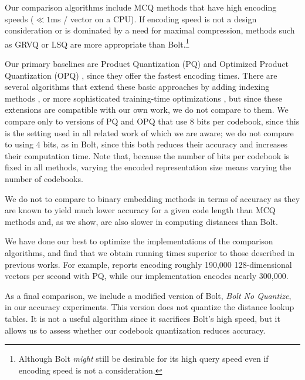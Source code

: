 Our comparison algorithms include MCQ methods that have high encoding speeds ($\ll 1$ms / vector on a CPU). If encoding speed is not a design consideration or is dominated by a need for maximal compression, methods such as GRVQ \cite{grvq} or LSQ \cite{lsq} are more appropriate than Bolt.\footnote{Although Bolt \textit{might} still be desirable for its high query speed even if encoding speed is not a consideration.}

Our primary baselines are Product Quantization (PQ) \cite{pq} and Optimized Product Quantization (OPQ) \cite{opq}, since they offer the fastest encoding times. There are several algorithms that extend these basic approaches by adding indexing methods \cite{lopq, NOIMI}, or more sophisticated training-time optimizations \cite{googleMips, pairQ, polysemous}, but since these extensions are compatible with our own work, we do not compare to them. We compare only to versions of PQ and OPQ that use 8 bits per codebook, since this is the setting used in all related work of which we are aware; we do not compare to using 4 bits, as in Bolt, since this both reduces their accuracy and increases their computation time. Note that, because the number of bits per codebook is fixed in all methods, varying the encoded representation size means varying the number of codebooks.

We do not to compare to binary embedding methods in terms of accuracy as they are known to yield much lower accuracy for a given code length than MCQ methods \cite{hashingSimilaritySurvey, opq} and, as we show, are also slower in computing distances than Bolt. %

We have done our best to optimize the implementations of the comparison algorithms, and find that we obtain running times superior to those described in previous works. For example, \cite{stackedQuantizers} reports encoding roughly 190,000 128-dimensional vectors per second with PQ, while our implementation encodes nearly 300,000.

As a final comparison, we include a modified version of Bolt, \textit{Bolt No Quantize}, in our accuracy experiments. This version does not quantize the distance lookup tables. It is not a useful algorithm since it sacrifices Bolt's high speed, but it allows us to assess whether our codebook quantization reduces accuracy.

